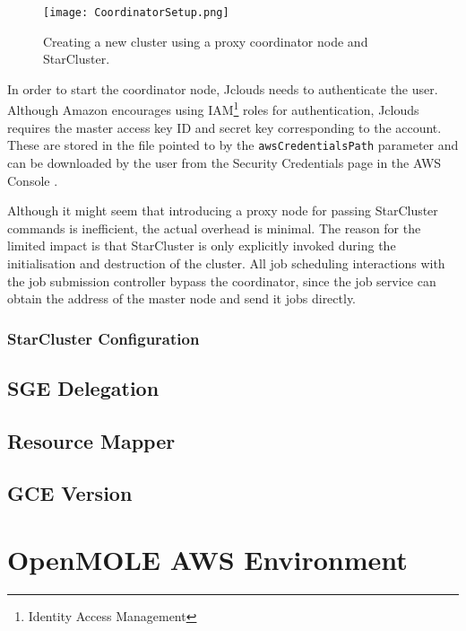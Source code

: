 \begin{figure}[h]
	\centering
		\texttt{[image: CoordinatorSetup.png]}
	\caption{Creating a new cluster using a proxy coordinator node and StarCluster.}
	\label{CoordinatorSetup}
\end{figure}

In order to start the coordinator node, Jclouds needs to authenticate the user. Although Amazon encourages using IAM\footnote{Identity Access Management} roles for authentication, Jclouds requires the master access key ID and secret key corresponding to the account. These are stored in the file pointed to by the \verb|awsCredentialsPath| parameter and can be downloaded by the user from the Security Credentials page in the AWS Console \cite{AWSCredentials}.

Although it might seem that introducing a proxy node for passing StarCluster commands is inefficient, the actual overhead is minimal. The reason for the limited impact is that StarCluster is only explicitly invoked during the initialisation and destruction of the cluster. All job scheduling interactions with the job submission controller bypass the coordinator, since the job service can obtain the address of the master node and send it jobs directly.

\subsubsection{StarCluster Configuration} \label{StarClusterConfigurationSection}

\subsection{SGE Delegation}

\subsection{Resource Mapper}

\subsection{GCE Version}

\section{OpenMOLE AWS Environment}

